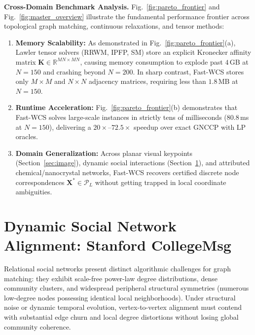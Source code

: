 \documentclass[conference]{IEEEtran}
\begin{document}
\textbf{Cross-Domain Benchmark Analysis.} 
Fig.~\ref{fig:pareto_frontier} and Fig.~\ref{fig:master_overview} illustrate the fundamental performance frontier across topological graph matching, continuous relaxations, and tensor methods:
\begin{enumerate}
    \item \textbf{Memory Scalability:} As demonstrated in Fig.~\ref{fig:pareto_frontier}(a), Lawler tensor solvers (RRWM, IPFP, SM) store an explicit Kronecker affinity matrix $\mathbf{K} \in \mathbb{R}^{MN \times MN}$, causing memory consumption to explode past $4$\,GB at $N=150$ and crashing beyond $N=200$. In sharp contrast, Fast-WCS stores only $M \times M$ and $N \times N$ adjacency matrices, requiring less than $1.8$\,MB at $N=150$.
    \item \textbf{Runtime Acceleration:} Fig.~\ref{fig:pareto_frontier}(b) demonstrates that Fast-WCS solves large-scale instances in strictly tens of milliseconds ($80.8$\,ms at $N=150$), delivering a $20\times\text{--}72.5\times$ speedup over exact GNCCP with LP oracles.
    \item \textbf{Domain Generalization:} Across planar visual keypoints (Section~\ref{sec:image}), dynamic social interactions (Section~\ref{sec:social_network}), and attributed chemical/nanocrystal networks, Fast-WCS recovers certified discrete node correspondences $\mathbf{X}^* \in \mathcal{P}_L$ without getting trapped in local coordinate ambiguities.
\end{enumerate}



\section{Dynamic Social Network Alignment: Stanford CollegeMsg}
\label{sec:social_network}

Relational social networks present distinct algorithmic challenges for graph matching: they exhibit scale-free power-law degree distributions, dense community clusters, and widespread peripheral structural symmetries (numerous low-degree nodes possessing identical local neighborhoods). Under structural noise or dynamic temporal evolution, vertex-to-vertex alignment must contend with substantial edge churn and local degree distortions without losing global community coherence.
\end{document}
